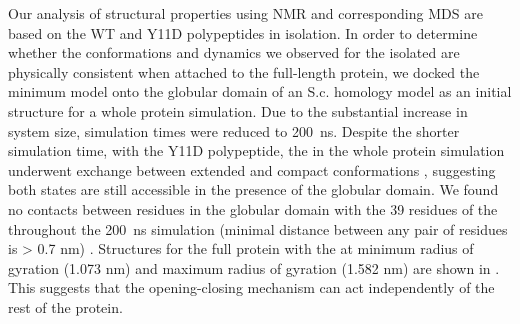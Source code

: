 Our analysis of \gct structural properties using NMR and corresponding MDS are based on the WT and Y11D \gct polypeptides in isolation. In order to determine whether the conformations and dynamics we observed for the isolated \gct are physically consistent when attached to the full-length \tub protein, we docked the minimum \diffusion \gct model  onto the globular domain of an S.c. \tub homology model as an initial structure for a whole protein simulation. Due to the substantial increase in system size, simulation times were reduced to \SI{200}{\ns}.  Despite the shorter simulation time, with the Y11D \gct polypeptide, the \gct in the whole protein simulation underwent exchange between extended and compact conformations , suggesting both states are still accessible in the presence of the globular domain. We found no contacts between residues in the globular domain with the 39 residues of the \gct throughout the \SI{200}{\ns} simulation (minimal distance between any pair of residues is > 0.7 nm) . Structures for the full protein with the \gct at minimum radius of gyration (1.073 nm) and maximum radius of gyration (1.582 nm) are shown in . This suggests that the \gct opening-closing mechanism can act independently of the rest of the protein.



\begin{figure}
	\thispagestyle{empty}
	\centering     %
	\clearpage
	\label{fig:globular}
\end{figure}


